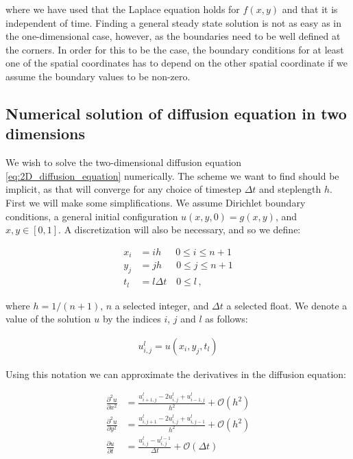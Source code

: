 \documentclass[reprint,english,notitlepage]{revtex4-1}  %
\begin{document}
where we have used that the Laplace equation holds for $f(x,y)$ and that it is independent of time. Finding a general steady state solution is not as easy as in the one-dimensional case, however, as the boundaries need to be well defined at the corners. In order for this to be the case, the boundary conditions for at least one of the spatial coordinates has to depend on the other spatial coordinate if we assume the boundary values to be non-zero. 





\subsection{Numerical solution of diffusion equation in two dimensions} \label{sec:formalism_2D_diff_eq_numerical}

We wish to solve the two-dimensional diffusion equation \eqref{eq:2D_diffusion_equation} numerically. The scheme we want to find should be implicit, as that will converge for any choice of timestep $\Delta t$ and steplength $h$. First we will make some simplifications. We assume Dirichlet boundary conditions, a general initial configuration $u(x,y,0) = g(x,y)$, and $x,y\in[0,1]$. A discretization will also be necessary, and so we define:

\begin{align*}
x_i &= i h \,\,\,\quad 0 \leq i \leq n+1 \\
y_j &= j h \,\,\,\quad 0 \leq j \leq n+1 \\
t_l &= l \Delta t \quad 0 \leq l \, ,
\end{align*}

where $h = 1/(n+1)$, $n$ a selected integer, and $\Delta t$ a selected float. We denote a value of the solution $u$ by the indices $i$, $j$ and $l$ as follows:

\begin{align*}
u_{i,j}^l = u(x_i,y_j,t_l)
\end{align*}

Using this notation we can approximate the derivatives in the diffusion equation:

\begin{align*}
\frac{\partial^2 u}{\partial x^2} &= \frac{u_{i+1,j}^l - 2u_{i,j}^l + u_{i-1,j}^l}{h^2} + \mathcal{O}(h^2) \\
\frac{\partial^2 u}{\partial y^2} &= \frac{u_{i,j+1}^l - 2u_{i,j}^l + u_{i,j-1}^l}{h^2} + \mathcal{O}(h^2)\\
\frac{\partial u}{\partial t} &= \frac{u_{i,j}^l - u_{i,j}^{l-1} }{\Delta t} + \mathcal{O}(\Delta t)
\end{align*}
\end{document}
